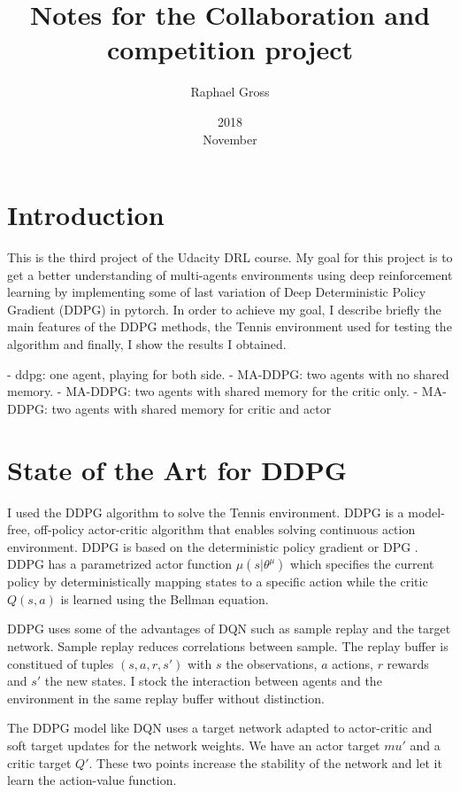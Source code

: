 \documentclass[12pt]{article}
\begin{document}
\title{Notes for the Collaboration and competition project}
\date{2018\\ November}
\author{Raphael Gross}
\maketitle




\section{Introduction}
This is the third project of the Udacity DRL course. My goal for this project is to get a better understanding of multi-agents environments using deep reinforcement learning by implementing some of last variation of Deep Deterministic Policy Gradient (DDPG) in pytorch. In order to achieve my goal, I describe briefly the main features of the DDPG methods, the Tennis environment used for testing the algorithm and finally, I show the results I obtained.

- ddpg: one agent, playing for both side.
- MA-DDPG: two agents with no shared memory.
- MA-DDPG: two agents with shared memory for the critic only.
- MA-DDPG: two agents with shared memory for critic and actor

\section{State of the Art for DDPG}

I used the DDPG algorithm to solve the Tennis environment. DDPG is a model-free, off-policy actor-critic algorithm that enables solving continuous action environment. 
DDPG is based on the deterministic policy gradient or DPG \cite{LHDWR14}.
DDPG has a parametrized actor function $\mu(s|{\theta}^{\mu})$ which specifies the current policy by deterministically mapping states to a specific action while the critic $Q(s,a)$ is learned using the Bellman equation.

DDPG uses some of the advantages of DQN such as sample replay and the target network.
Sample replay reduces correlations between sample. The replay buffer is constitued of tuples $(s,a,r,s')$  with $s$ the observations, $a$ actions, $r$ rewards and $s'$ the new states.
I stock the interaction between agents and the environment in the same replay buffer without distinction.

The DDPG model like DQN\cite{mnih2015humanlevel} uses a target network adapted to actor-critic and soft target updates for the network weights. We have an actor target $mu'$ and a critic target $Q'$. These two points increase the stability of the network and let it learn the action-value function. 
\end{document}
